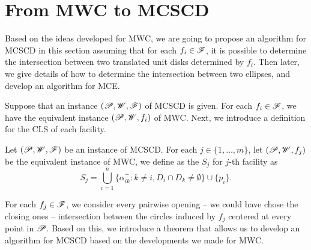 \section{From MWC to MCSCD}

Based on the ideas developed for MWC, we are going to propose an algorithm for MCSCD in this section assuming that for each $f_i \in \mathscr{F}$, it is possible to determine the intersection between two translated unit disks determined by $f_i$.
Then later, we give details of how to determine the intersection between two ellipses, and develop an algorithm for MCE.

Suppose that an instance $(\mathscr{P}, \mathscr{W}, \mathscr{F})$ of MCSCD is given. For each $f_i \in \mathscr{F}$, we have the equivalent instance $(\mathscr{P}, \mathscr{W}, f_i)$ of MWC. Next, we introduce a definition for the CLS of each facility.

\begin{definicao}
	Let $(\mathscr{P}, \mathscr{W}, \mathscr{F})$ be an instance of MCSCD. For each $j \in \{1, \dots, m\}$, let \mbox{$(\mathscr{P},  \mathscr{W}, f_j)$} be the equivalent instance of MWC, we define as the  $S_j$ for $j$-th facility as
	\begin{equation*}
	S_j = \bigcup_{i=1}^n \{\alpha_{ik}^+ \colon k\neq i, D_i \cap D_k \neq \emptyset\}\cup \{p_i\}.
	\end{equation*}
\end{definicao}

For each $f_j \in \mathscr{F}$, we consider every pairwise opening -- we could have chose the closing ones -- intersection between the circles induced by $f_j$ centered at every point in $\mathscr{P}$.
Based on this, we introduce a theorem that allows us to develop an algorithm for MCSCD based on the developments we made for MWC.


